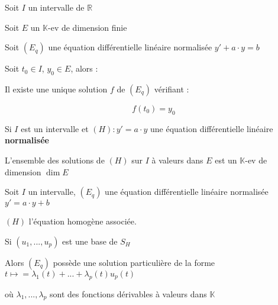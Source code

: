 \documentclass[a4paper,12pt]{book}
\newcommand{\Thr}[2]{\begin{tcolorbox}[sharp corners, colback=white,colframe=red!10!blue!30!green!75!, title=Théorème : #1]#2\end{tcolorbox}}
\def\R{\mathbb{R}}
\def\K{\mathbb{K}}
\begin{document}
\Thr{Cauchy-Lipschitz linéaire}{Soit $I$ un intervalle de $\R$
\par Soit $E$ un $\K$-ev de dimension finie
\par Soit $(E_q)$ une équation différentielle linéaire normalisée $y'+a\cdot y = b$
\par Soit $t_0\in I$, $y_0\in E$, alors :
\par Il existe une unique solution $f$ de $(E_q)$ vérifiant :
\par $$f(t_0)=y_0$$}
\Thr{Corollaire}{Si $I$ est un intervalle et $(H) : y' = a\cdot y$ une équation différentielle linéaire \textbf{normalisée}
\par L'ensemble des solutions de $(H)$ sur $I$ à valeurs dans $E$ est un $\K$-ev de dimension $\dim E$}
\Thr{Variation des constantes}{Soit $I$ un intervalle, $(E_q)$ une équation différentielle linéaire normalisée $y'=a\cdot y + b$
\par $(H)$ l'équation homogène associée.
\par Si $(u_1,...,u_p)$ est une base de $S_H$
\par Alors $(E_q)$ possède une solution particulière de la forme $t\mapsto =\lambda_1(t) +...+\lambda_p(t)u_p(t)$
\par où $\lambda_1,...,\lambda_p$ sont des fonctions dérivables à valeurs dans $\K$}
\end{document}
